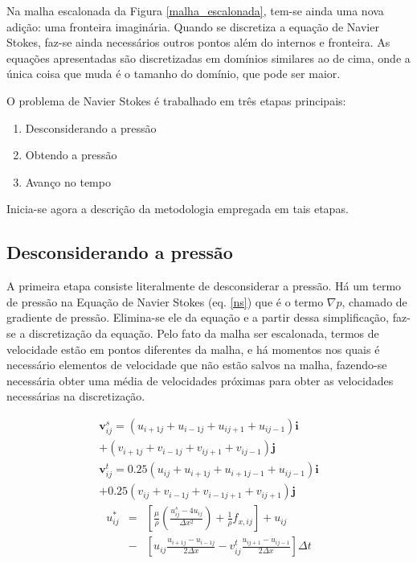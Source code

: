 \documentclass[journal]{IEEEtran}
\begin{document}
Na malha escalonada da Figura \ref{malha_escalonada}, tem-se ainda uma nova adição: uma fronteira imaginária. Quando se discretiza a equação de Navier Stokes, faz-se ainda necessários outros pontos além do internos e fronteira. As equações apresentadas são discretizadas em domínios similares ao de cima, onde a única coisa que muda é o tamanho do domínio, que pode ser maior.

O problema de Navier Stokes é trabalhado em três etapas principais:

\begin{enumerate}
  \item Desconsiderando a pressão
  \item Obtendo a pressão
  \item Avanço no tempo
\end{enumerate}

Inicia-se agora a descrição da metodologia empregada em tais etapas.

\subsection{Desconsiderando a pressão}
A primeira etapa consiste literalmente de desconsiderar a pressão. Há um termo de pressão na Equação de Navier Stokes (eq. \ref{ns}) que é o termo $\nabla p$, chamado de gradiente de pressão. Elimina-se ele da equação e a partir dessa simplificação, faz-se a discretização da equação. Pelo fato da malha ser escalonada, termos de velocidade estão em pontos diferentes da malha, e há momentos nos quais é necessário elementos de velocidade que não estão salvos na malha, fazendo-se necessária obter uma média de velocidades próximas para obter as velocidades necessárias na discretização.
 
\begin{eqnarray}
\textbf{v}_{ij}^s=(u_{i+1j}+u_{i-1j}+u_{ij+1}+u_{ij-1})\textbf{i} 
\nonumber \\+(v_{i+1j}+v_{i-1j}+v_{ij+1}+v_{ij-1})\textbf{j}\\
\textbf{v}_{ij}^t=0.25(u_{ij}+u_{i+1j}+u_{i+1j-1}+u_{ij-1})\textbf{i}\nonumber \\
+0.25(v_{ij}+v_{i-1j}+v_{i-1j+1}+v_{ij+1})\textbf{j}
\end{eqnarray}
\begin{eqnarray}
u_{ij}^{*}&=&\left[\frac{\mu}{\rho}\left(\frac{u_{ij}^s-4u_{ij}}{\Delta
x^2}\right)+\frac{1}{\rho}f_{x,ij}\right] + u_{ij}\nonumber \\
&-&\left[u_{ij}\frac{u_{i+1j}-u_{i-1j}}{2\Delta
x}-v_{ij}^t\frac{u_{ij+1}-u_{ij-1}}{2\Delta x}\right]\Delta t
\end{eqnarray}
\end{document}
